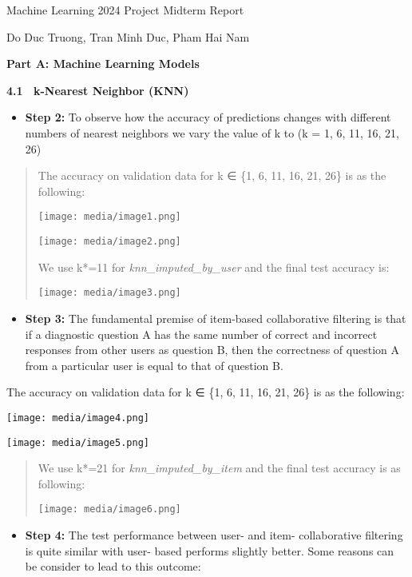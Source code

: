 Machine Learning 2024 Project Midterm Report

Do Duc Truong, Tran Minh Duc, Pham Hai Nam

\textbf{Part A: Machine Learning Models~}

\textbf{4.1~ k-Nearest Neighbor (KNN)}

\begin{itemize}
\item
  \textbf{Step 2:} To observe how the accuracy of predictions changes
  with different numbers of nearest neighbors we vary the value of k to
  (k = 1, 6, 11, 16, 21, 26)
\end{itemize}

\begin{quote}
The accuracy on validation data for k ∈ \{1, 6, 11, 16, 21, 26\} is as
the following:~

\texttt{[image: media/image1.png]}

\texttt{[image: media/image2.png]}

We use k*=11 for \emph{knn\_imputed\_by\_user} and the final test
accuracy is:

\texttt{[image: media/image3.png]}
\end{quote}

\begin{itemize}
\item
  \textbf{Step 3:} The fundamental premise of item-based collaborative
  filtering is that if a diagnostic question A has the same number of
  correct and incorrect responses from other users as question B, then
  the correctness of question A from a particular user is equal to that
  of question B.
\end{itemize}

The accuracy on validation data for k ∈ \{1, 6, 11, 16, 21, 26\} is as
the following:

\texttt{[image: media/image4.png]}

\texttt{[image: media/image5.png]}

\begin{quote}
We use k*=21 for \emph{knn\_imputed\_by\_item} and the final test
accuracy is as following:

\texttt{[image: media/image6.png]}
\end{quote}

\begin{itemize}
\item
  \textbf{Step 4:} The test performance between user- and item-
  collaborative filtering is quite similar with user- based performs
  slightly better. Some reasons can be consider to lead to this outcome:
\end{itemize}


